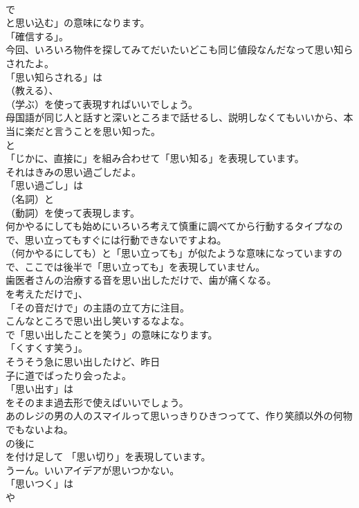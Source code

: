 \documentclass[8pt]{extreport}
\begin{document}
\begin{CJK}{UTF8}{min}
\\	で
\\	と思い込む」の意味になります。
\\	「確信する」。	
\\	今回、いろいろ物件を探してみてだいたいどこも同じ値段なんだなって思い知らされたよ。 
\\	「思い知らされる」は 
\\	（教える）、
\\	（学ぶ）を使って表現すればいいでしょう。	
\\	母国語が同じ人と話すと深いところまで話せるし、説明しなくてもいいから、本当に楽だと言うことを思い知った。 
\\	と
\\	「じかに、直接に」を組み合わせて「思い知る」を表現しています。	
\\	それはきみの思い過ごしだよ。 
\\	「思い過ごし」は 
\\	（名詞）と 
\\	（動詞）を使って表現します。	
\\	何かやるにしても始めにいろいろ考えて慎重に調べてから行動するタイプなので、思い立ってもすぐには行動できないですよね。 
\\	（何かやるにしても）と「思い立っても」が似たような意味になっていますので、ここでは後半で「思い立っても」を表現していません。	
\\	歯医者さんの治療する音を思い出しただけで、歯が痛くなる。 
\\	を考えただけで」、
\\	「その音だけで」の主語の立て方に注目。	
\\	こんなところで思い出し笑いするなよな。 
\\	で「思い出したことを笑う」の意味になります。
\\	「くすくす笑う」。	
\\	そうそう急に思い出したけど、昨日
\\	子に道でばったり会ったよ。 
\\	「思い出す」は
\\	をそのまま過去形で使えばいいでしょう。	
\\	あのレジの男の人のスマイルって思いっきりひきつってて、作り笑顔以外の何物でもないよね。 
\\	の後に
\\	を付け足して 「思い切り」を表現しています。	
\\	うーん。いいアイデアが思いつかない。 
\\	「思いつく」は
\\	や

\end{CJK}
\end{document}
